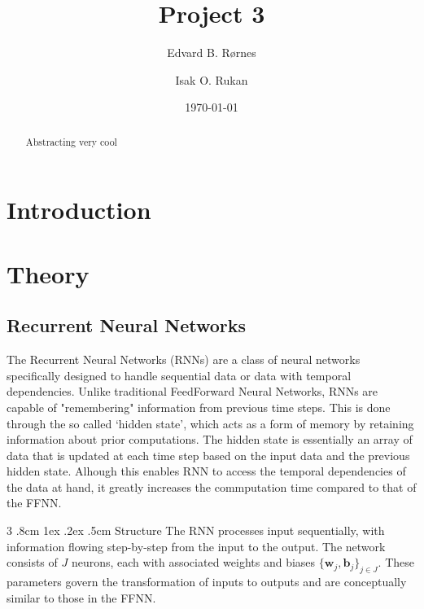 \documentclass[%
reprint,
amsmath,amssymb,
aps,
]{revtex4-2}
\makeatletter
\renewcommand{\subsubsection}{%
	\@startsection
	{subsubsection}%
	{3}%
	{\z@}%
	{.8cm \@plus1ex \@minus .2ex}%
	{.5cm}%
	{\normalfont\small\centering}%
}
\makeatother
\begin{document}
	
\title{Project 3}
\author{Edvard B. Rørnes}
\author{Isak O. Rukan}
\date{\today}

\begin{abstract}
	Abstracting very cool
\end{abstract}

\maketitle
\tableofcontents

\section{Introduction}


\section{Theory}
\subsection{Recurrent Neural Networks}
The Recurrent Neural Networks (RNNs) are a class of neural networks specifically designed to handle sequential data or data with temporal dependencies. Unlike traditional FeedForward Neural Networks, RNNs are capable of "remembering" information from previous time steps. This is done through the so called `hidden state', which acts as a form of memory by retaining information about prior computations. The hidden state is essentially an array of data that is updated at each time step based on the input data and the previous hidden state. Alhough this enables RNN to access the temporal dependencies of the data at hand, it greatly increases the commputation time compared to that of the FFNN. 

\subsubsection{Structure}
The RNN processes input sequentially, with information flowing step-by-step from the input to the output. The network consists of \(J\) neurons, each with associated weights and biases \(\{\boldsymbol{w}_{j}, \boldsymbol{b}_{j}\}_{j\in J}\). These parameters govern the transformation of inputs to outputs and are conceptually similar to those in the FFNN.
\end{document}
